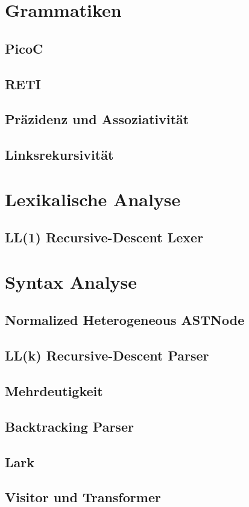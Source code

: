 \documentclass{scrreprt}
\begin{document}
  \section{Grammatiken}
  \subsection{PicoC}
  \subsection{RETI}
  \subsection{Präzidenz und Assoziativität}
  \subsection{Linksrekursivität}
  \section{Lexikalische Analyse}
  \subsection{LL(1) Recursive-Descent Lexer}
  \section{Syntax Analyse}
  \subsection{Normalized Heterogeneous ASTNode}
  \subsection{LL(k) Recursive-Descent Parser}
  \subsection{Mehrdeutigkeit}
  \subsection{Backtracking Parser}
  \subsection{Lark}
  \subsection{Visitor und Transformer}
\end{document}

